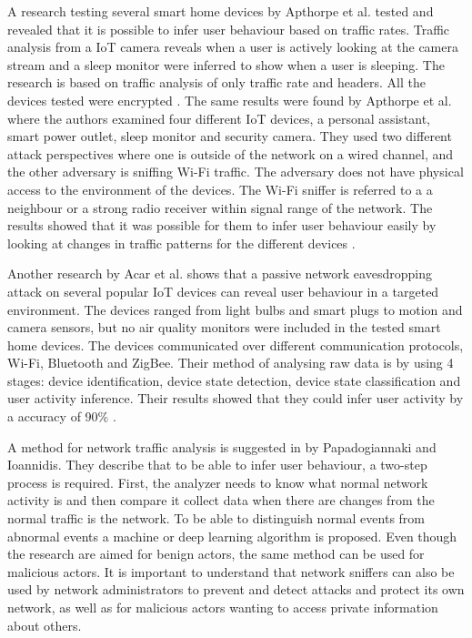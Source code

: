 A research testing several smart home devices by Apthorpe et al. \cite{SpyingonSmartHomes} tested and revealed that it is possible to infer user behaviour based on traffic rates. Traffic analysis from a \gls{IoT} camera reveals when a user is actively looking at the camera stream and a sleep monitor were inferred to show when a user is sleeping. The research is based on traffic analysis of only traffic rate and headers. All the devices tested were encrypted \cite{SpyingonSmartHomes}. The same results were found by Apthorpe et al.\cite{WiFiSniffInfer} where the authors examined four different \gls{IoT} devices, a personal assistant, smart power outlet, sleep monitor and security camera. They used two different attack perspectives where one is outside of the network on a wired channel, and the other adversary is sniffing \gls{Wi-Fi} traffic. The adversary does not have physical access to the environment of the devices. The \gls{Wi-Fi} sniffer is referred to a a neighbour or a strong radio receiver within signal range of the network. The results showed that it was possible for them to infer user behaviour easily by looking at changes in traffic patterns for the different devices \cite{WiFiSniffInfer}. 

Another research by Acar et al. \cite{PeakaBoo} shows that a passive network eavesdropping attack on several popular \gls{IoT} devices can reveal user behaviour in a targeted environment. The devices ranged from light bulbs and smart plugs to motion and camera sensors, but no air quality monitors were included in the tested smart home devices. The devices communicated over different communication protocols, \gls{Wi-Fi}, Bluetooth and ZigBee. Their method of analysing raw data is by using 4 stages: device identification, device state detection, device state classification and user activity inference. Their results showed that they could infer user activity by a accuracy of 90\% \cite{PeakaBoo}. 

A method for network traffic analysis is suggested in \cite{NetAna} by Papadogiannaki and Ioannidis. They describe that to be able to infer user behaviour, a two-step process is required. First, the analyzer needs to know what normal network activity is and then compare it collect data when there are changes from the normal traffic is the network. To be able to distinguish normal events from abnormal events a machine or deep learning algorithm is proposed. Even though the research are aimed for benign actors, the same method can be used for malicious actors. It is important to understand that network sniffers can also be used by network administrators to prevent and detect attacks and protect its own network, as well as for malicious actors wanting to access private information about others. 